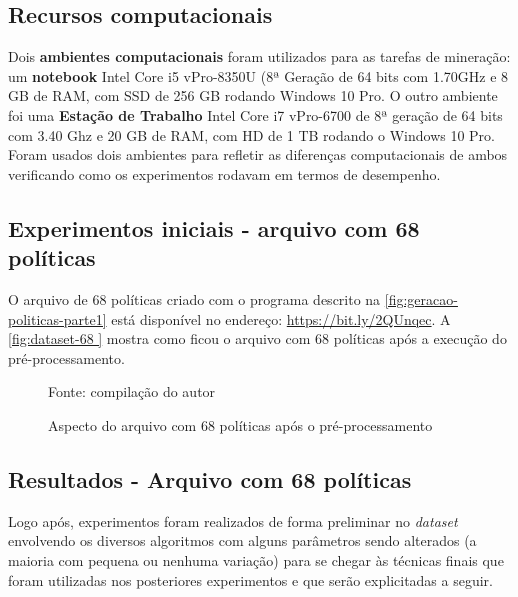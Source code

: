 \subsection{Recursos computacionais}
Dois \textbf{ambientes computacionais} foram utilizados para as tarefas de mineração: um \textbf{notebook}  Intel Core i5 vPro-8350U (8ª Geração de 64 bits com 1.70GHz e 8 GB de RAM, com SSD de 256 GB rodando Windows 10 Pro. O outro ambiente foi uma \textbf{Estação de Trabalho} Intel Core i7 vPro-6700 de 8ª geração de 64 bits com 3.40 Ghz e 20 GB de RAM, com HD de 1 TB rodando o Windows 10 Pro. Foram usados dois ambientes para refletir as diferenças computacionais de ambos verificando como os experimentos rodavam em termos de desempenho.

\subsection{Experimentos iniciais - arquivo com 68 políticas}\label{exp:iniciais}
O arquivo de 68 políticas criado com o programa descrito na \autoref{fig:geracao-politicas-parte1} está disponível no endereço: \url{https://bit.ly/2QUnqec}.
A \autoref{fig:dataset-68 } mostra como ficou o arquivo com 68 políticas após a execução do pré-processamento.
\begin{figure}%
	\centering
	\caption{Aspecto do arquivo com 68 políticas após o pré-processamento}%
	
	\label{fig:dataset-68 }
	{\scriptsize Fonte: compilação do autor}
\end{figure}

\subsection{Resultados - Arquivo com 68 políticas}
Logo após, experimentos foram realizados de forma preliminar no \textit{dataset} envolvendo os diversos algoritmos com alguns parâmetros sendo alterados (a maioria com pequena ou nenhuma variação) para se chegar às técnicas finais que foram utilizadas nos posteriores experimentos e que serão explicitadas a seguir.

